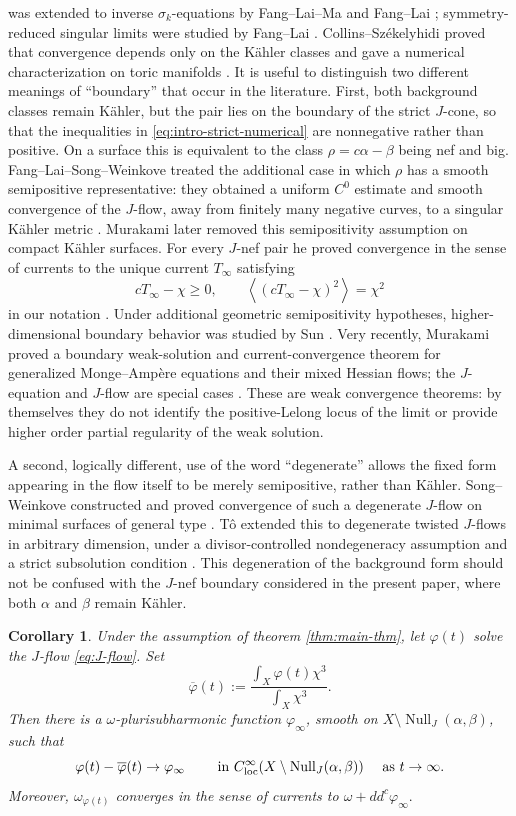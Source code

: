 \documentclass[reqno]{amsart}
\theoremstyle{remark}
\newcommand{\ddc}{dd^c}
\newcommand{\JNull}{\operatorname{Null}_{J}}
\theoremstyle{plain}
\newtheorem{cor}[thm]{Corollary}
\begin{document}
was extended to inverse $\sigma_k$-equations by Fang--Lai--Ma and
Fang--Lai \cite{FLM11,FL12}; symmetry-reduced singular limits
were studied by Fang--Lai \cite{FL13}.  Collins--Sz\'ekelyhidi
proved that convergence depends only on the K\"ahler classes and gave a
numerical characterization on toric manifolds
\cite{CS17}. It is useful
to distinguish two different meanings of
``boundary'' that occur in the literature.  First, both background
classes remain K\"ahler, but the pair lies on the boundary of the
strict $J$-cone, so that the inequalities in
\eqref{eq:intro-strict-numerical} are nonnegative rather than positive.
On a surface this is equivalent to the class
$\rho=c\alpha-\beta$ being nef and big.  Fang--Lai--Song--Weinkove
treated the additional case in which $\rho$ has a smooth
semipositive representative: they obtained a uniform $C^0$ estimate
and smooth convergence of the $J$-flow, away from finitely many
negative curves, to a singular K\"ahler metric
\cite{FLSW14}.  Murakami later removed this semipositivity
assumption on compact K\"ahler surfaces.  For every 
$J$-nef pair he proved convergence in the sense of currents to the
unique current $T_\infty$ satisfying
\[
 cT_\infty-\chi\geq0,
 \qquad
 \left\langle(cT_\infty-\chi)^2\right\rangle=\chi^2
\]
in our notation \cite{M26a}.  Under additional geometric
semipositivity hypotheses, higher-dimensional boundary behavior was
studied by Sun \cite{S24}.  Very recently, Murakami proved a
boundary weak-solution and current-convergence theorem for generalized
Monge--Amp\`ere equations and their mixed Hessian flows; the
$J$-equation and $J$-flow are special cases
\cite{M26b}.  These are weak convergence theorems: by themselves
they do not identify the positive-Lelong locus of the limit or provide higher order partial regularity of the weak solution.

A second, logically different, use of the word ``degenerate'' allows
the fixed form appearing in the flow itself to be merely semipositive,
rather than K\"ahler.  Song--Weinkove constructed and proved convergence
of such a degenerate $J$-flow on minimal surfaces of general type
\cite{SW08}.  T\^o extended this to degenerate twisted
$J$-flows in arbitrary dimension, under a divisor-controlled
nondegeneracy assumption and a strict subsolution condition
\cite{T23}.  This degeneration of the background form should
not be confused with the $J$-nef boundary considered in
the present paper, where both $\alpha$ and $\beta$ remain K\"ahler.

\begin{cor}\label{cor:convergence-J-flow}Under the assumption of theorem \ref{thm:main-thm}, let $\varphi(t)$ solve the $J$-flow \eqref{eq:J-flow}. Set \[\overline{\varphi}(t):=\frac{\int_X\varphi(t)\chi^3}{\int_X\chi^3}.
\]Then there is a $\omega$-plurisubharmonic function $\varphi_\infty$, smooth on $X\setminus \JNull(\alpha,\beta)$, such that \[
\varphi(t)-\overline{\varphi}(t)\to \varphi_{\infty}\qquad \text{ in }C^\infty_{\rm loc}(X\setminus \JNull(\alpha,\beta)) \quad \text{ as }t\to \infty
.\]
Moreover, $\omega_{\varphi(t)}$ converges in the sense of currents to $\omega+\ddc\varphi_\infty.$
    
\end{cor}
\end{document}

